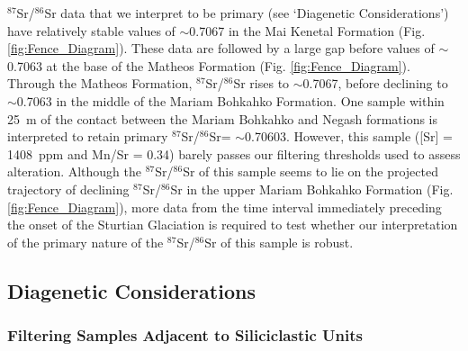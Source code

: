 \documentclass[11pt,letterpaper]{article}
\newcommand{\SrSr}{$^{87}$Sr/$^{86}$Sr\xspace}
\begin{document}
\SrSr data that we interpret to be primary (see `Diagenetic Considerations') have relatively stable values of $\sim$0.7067 in the Mai Kenetal Formation (Fig. \ref{fig:Fence_Diagram}). These data are followed by a large gap before values of $\sim$0.7063 at the base of the Matheos Formation (Fig. \ref{fig:Fence_Diagram}). Through the Matheos Formation, \SrSr rises to $\sim$0.7067, before declining to $\sim$0.7063 in the middle of the Mariam Bohkahko Formation. One sample within 25~m of the contact between the Mariam Bohkahko and Negash formations is interpreted to retain primary \SrSr = $\sim$0.70603. However, this sample ([Sr] = 1408~ppm and Mn/Sr = 0.34) barely passes our filtering thresholds used to assess alteration. Although the \SrSr of this sample seems to lie on the projected trajectory of declining \SrSr in the upper Mariam Bohkahko Formation (Fig. \ref{fig:Fence_Diagram}), more data from the time interval immediately preceding the onset of the Sturtian Glaciation is required to test whether our interpretation of the primary nature of the \SrSr of this sample is robust.

\subsection*{Diagenetic Considerations \label{sec:DiageneticConsiderations}}

\subsubsection*{Filtering Samples Adjacent to Siliciclastic Units}
\end{document}
